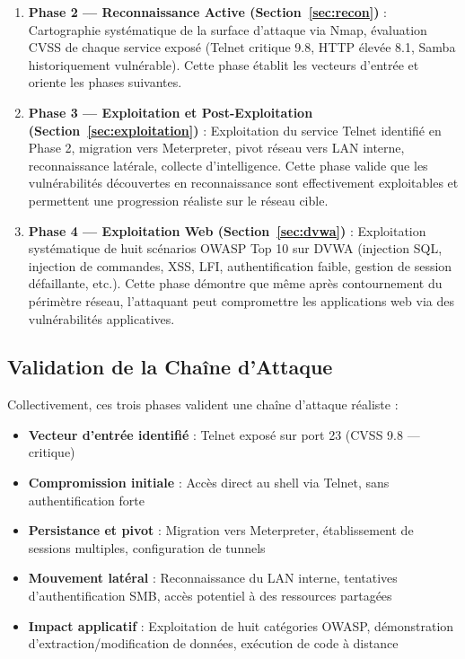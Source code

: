 \documentclass[12pt,a4paper,openany]{report}
\begin{document}
	\begin{enumerate}
		\item \textbf{Phase 2 — Reconnaissance Active (Section~\ref{sec:recon})} : Cartographie systématique de la surface d'attaque via Nmap, évaluation CVSS de chaque service exposé (Telnet critique 9.8, HTTP élevée 8.1, Samba historiquement vulnérable). Cette phase établit les vecteurs d'entrée et oriente les phases suivantes.
		
		\item \textbf{Phase 3 — Exploitation et Post-Exploitation (Section~\ref{sec:exploitation})} : Exploitation du service Telnet identifié en Phase 2, migration vers Meterpreter, pivot réseau vers LAN interne, reconnaissance latérale, collecte d'intelligence. Cette phase valide que les vulnérabilités découvertes en reconnaissance sont effectivement exploitables et permettent une progression réaliste sur le réseau cible.
		
		\item \textbf{Phase 4 — Exploitation Web (Section~\ref{sec:dvwa})} : Exploitation systématique de huit scénarios OWASP Top 10 sur DVWA (injection SQL, injection de commandes, XSS, LFI, authentification faible, gestion de session défaillante, etc.). Cette phase démontre que même après contournement du périmètre réseau, l'attaquant peut compromettre les applications web via des vulnérabilités applicatives.
	\end{enumerate}
	
	\subsection{Validation de la Chaîne d'Attaque}
	
	Collectivement, ces trois phases valident une chaîne d'attaque réaliste :
	\begin{itemize}
		\item \textbf{Vecteur d'entrée identifié} : Telnet exposé sur port 23 (CVSS 9.8 — critique)
		\item \textbf{Compromission initiale} : Accès direct au shell via Telnet, sans authentification forte
		\item \textbf{Persistance et pivot} : Migration vers Meterpreter, établissement de sessions multiples, configuration de tunnels
		\item \textbf{Mouvement latéral} : Reconnaissance du LAN interne, tentatives d'authentification SMB, accès potentiel à des ressources partagées
		\item \textbf{Impact applicatif} : Exploitation de huit catégories OWASP, démonstration d'extraction/modification de données, exécution de code à distance
	\end{itemize}
	
\end{document}
